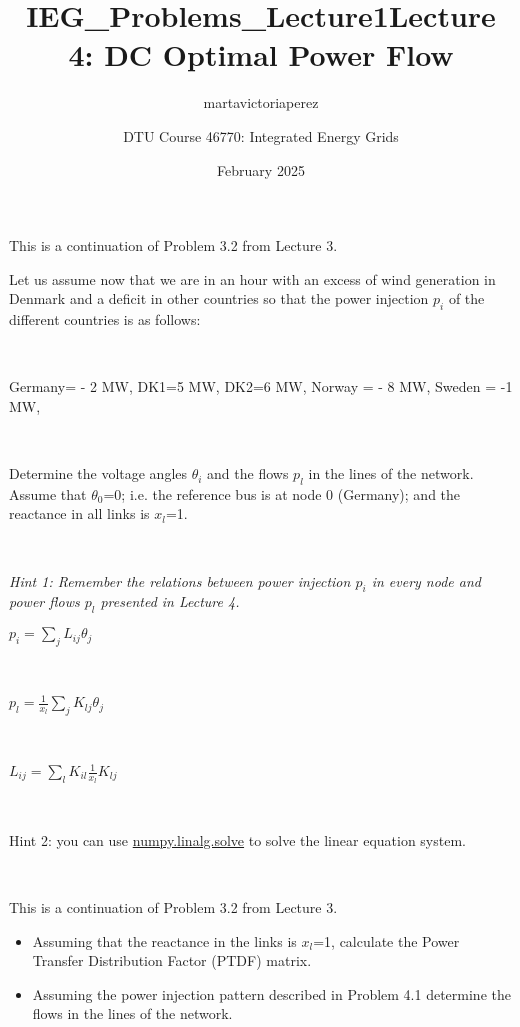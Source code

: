 \documentclass[10pt]{article}
\title{IEG_Problems_Lecture1}
\author{martavictoriaperez }
\date{February 2025}
\newenvironment{problem}[2][Problem]{\begin{trivlist}
\item[\hskip \labelsep {\bfseries #1}\hskip \labelsep {\bfseries #2.}]}{\end{trivlist}}
\begin{document}
 
\title{\textbf{Lecture 4: DC Optimal Power Flow}}
\author{
DTU Course 46770: Integrated Energy Grids }
\maketitle
\begin{problem}{4.1}

This is a continuation of Problem 3.2 from Lecture 3.

Let us assume now that we are in an hour with an excess of wind generation in Denmark and a deficit in other countries so that the power injection $p_i$ of the different countries is as follows:

\

Germany= - 2 MW, DK1=5 MW, DK2=6 MW, Norway = - 8 MW, Sweden = -1 MW, 

\

Determine the voltage angles $\theta_i$  and the flows $p_l$ in the lines of the network. Assume that $\theta_0$=0; i.e. the reference bus is at node 0 (Germany); and the reactance in all links is $x_l$=1.

\

\textit{Hint 1: Remember the relations between power injection $p_i$ in every node and power flows $p_l$ presented in Lecture 4.}

$p_i=\sum_j {L_{ij} \theta_j } $

\

$p_l=\frac{1}{x_l}  \sum_j{K_{lj} \theta_j}$       

\

$L_{ij}=\sum_l{K_{il} \frac{1}{x_l} K_{lj}}$

\

Hint 2: you can use \href{https://numpy.org/doc/2.1/reference/generated/numpy.linalg.solve.html}{numpy.linalg.solve} to solve the linear equation system. 



\end{problem}

\

\begin{problem}{4.2}

This is a continuation of Problem 3.2 from Lecture 3.

\begin{itemize}

\item[a)] Assuming that the reactance in the links is $x_l$=1, calculate the Power Transfer Distribution Factor (PTDF) matrix.

\item[b)] Assuming the power injection pattern described in Problem 4.1 determine the flows in the lines of the network. 

\end{itemize}

\end{problem}
\end{document}
